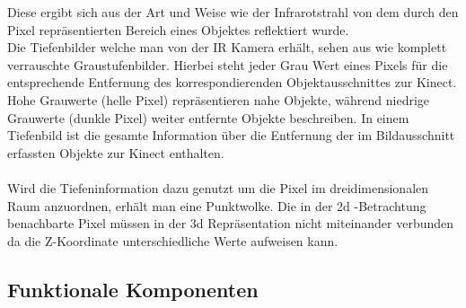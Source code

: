 Diese ergibt sich aus der Art und Weise wie der Infrarotstrahl von dem durch den Pixel repräsentierten Bereich eines Objektes reflektiert wurde.
\\
Die Tiefenbilder welche man von der IR Kamera erhält, sehen aus wie komplett verrauschte Graustufenbilder. Hierbei steht jeder Grau Wert eines Pixels für die entsprechende Entfernung des korrespondierenden Objektausschnittes zur Kinect.\\
Hohe Grauwerte (helle Pixel) repräsentieren nahe Objekte, während niedrige Grauwerte (dunkle Pixel) weiter entfernte Objekte beschreiben. In einem Tiefenbild ist die gesamte Information über die Entfernung der im Bildausschnitt erfassten Objekte zur Kinect enthalten.\\\\
Wird die Tiefeninformation dazu genutzt um die Pixel im dreidimensionalen Raum anzuordnen, erhält man eine Punktwolke. Die in der 2d 
-Betrachtung benachbarte Pixel müssen in der 3d Repräsentation nicht miteinander verbunden da die Z-Koordinate unterschiedliche Werte aufweisen kann.
\subsection{Funktionale Komponenten}

